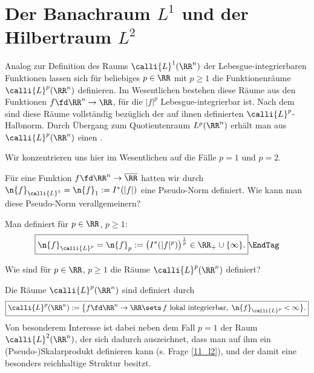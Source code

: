 \section{Der Banachraum $L^1$ und der Hilbertraum $L^2$}

Analog zur Definition des Raums $\calli{L}^1(\RR^n)$ 
der Lebesgue-integrierbaren Funktionen lassen sich für beliebiges 
$p\in \RR$ mit $p\ge 1$ die Funktionenräume $\calli{L}^p(\RR^n)$ definieren. 
Im Wesentlichen bestehen diese Räume aus den Funktionen $f\fd \RR^n\to\RR$, 
für die $|f|^p$ Lebesgue-integrierbar ist. Nach dem 
 sind diese Räume 
vollständig bezüglich der auf ihnen definierten $\calli{L}^p$-Halbnorm. 
Durch Übergang zum Quotientenraum $L^p(\RR^n)$ erhält man aus 
$\calli{L}^p(\RR^n)$ einen . 

Wir konzentrieren uns hier im Wesentlichen auf die 
Fälle $p=1$ und $p=2$. 


\begin{frage}
  Für eine Funktion $f\fd\RR^n\to\overline{\RR}$ hatten wir durch 
  $\n{f}_{\calli{L}^1} = \n{f}_1 := I^*(|f|)$ eine Pseudo-Norm definiert. 
  Wie kann man diese Pseudo-Norm verallgemeinern?
\end{frage}

\begin{antwort}
  Man definiert für $p\in \RR$, $p\ge 1$:
  \[
  \boxed{
    \n{f}_{\calli{L}^p} = \n{f}_p := \big( I^*(|f|^p) \big)^{\frac{1}{p}} 
    \in \RR_+ \cup \{ \infty \}.
  } \EndTag
  \]
\end{antwort}



\begin{frage}
  Wie sind für $p\in\RR$, $p\ge 1$ die Räume $\calli{L}^p(\RR^n)$ definiert?
\end{frage}

\begin{antwort}
  Die Räume $\calli{L}^p(\RR^n)$ sind definiert durch
  \[
  \boxed{
    \calli{L}^p ( \RR^n ):= \big\{ f\fd \RR^n \to\RR \sets \,
    \text{$f$ lokal integrierbar},\; \n{f}_{\calli{L}^p} <\infty \big\}.
  }
  \]
  Von besonderem Interesse ist dabei neben dem Fall $p=1$ der 
  Raum $\calli{L}^2(\RR^n)$, der sich dadurch auszeichnet, dass man auf 
  ihm ein (Pseudo-)Skalarprodukt definieren kann (s. Frage \ref{11_l2}), 
  und der damit eine besonders reichhaltige Struktur besitzt. \AntEnd
\end{antwort}

